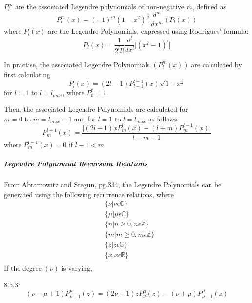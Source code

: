 \documentclass{revtex4-1}
\begin{document}
$P^{m}_{l}$ are the associated Legendre polynomials of non-negative $m$, defined as
\begin{equation}
P^{m}_{l}\left(x\right)=\left(-1\right)^{m}\left(1-x^{2}\right)^{\frac{m}{2}}\frac{d^{m}}{dx^{m}}\left(P_{l}\left(x\right)\right)
\end{equation}
where $P_{l}\left(x\right)$ are the Legendre Polynomials, expressed using Rodrigues' formula:
\begin{equation}
P_{l}\left(x\right)=\frac{1}{2^{l}l!}\frac{d^{l}}{dx^{l}}\lbrack\left(x^{2}-1\right)^{l}\rbrack
\end{equation} 

In practise, the associated Legendre Polynomials $\left(P^{m}_{l}\left(x\right)\right)$ are calculated by first calculating
\begin{equation*}
P^{l}_{l}\left(x\right)=\left(2l-1\right)P^{l-1}_{l-1}\left(x\right)\sqrt{1-x^{2}}
\end{equation*}
for $l=1 \mbox{ to } l=l_{max}$, where $P^{0}_{0}=1$.

Then, the associated Legendre Polynomials are calculated for $m=0\mbox{ to }m=l_{max}-1$ and for $l=1 \mbox{ to } l=l_{max}$ as follows
\begin{equation}
P^{l+1}_{m}\left(x\right)=\frac{\lbrack\left(2l+1\right)xP^{l}_{m}\left(x\right)-\left(l+m\right)P^{l-1}_{m}\left(x\right)\rbrack}{l-m+1}
\end{equation}
where $P^{l-1}_{m}\left(x\right)=0\mbox{ if }l-1<m$.

\subparagraph{Legendre Polynomial Recursion Relations}\label{S:LegPolyRecursive}
From Abramowitz and Stegun, pg.334, the Legendre Polynomials can be generated using the following recurrence relations, where 
\begin{align*}
&\{\nu | \nu \epsilon \mathbb{C} \}\\
&\{\mu | \mu \epsilon \mathbb{C} \}\\
&\{n | n \geq0, n \epsilon \mathbb{Z} \}\\
&\{m | m \geq0, m \epsilon \mathbb{Z} \}\\
&\{z | z \epsilon \mathbb{C} \}\\
&\{x | x \epsilon \mathbb{R} \}\\
\end{align*}
If the degree $(\nu)$ is varying,

8.5.3:
\begin{equation}
\left( \nu - \mu +1 \right)P^{\mu}_{\nu+1}\left( z \right) = (2\nu+1)zP^{\mu}_{\nu}(z)-(\nu+\mu)P^{\mu}_{\nu-1}(z)
\end{equation}
\end{document}
